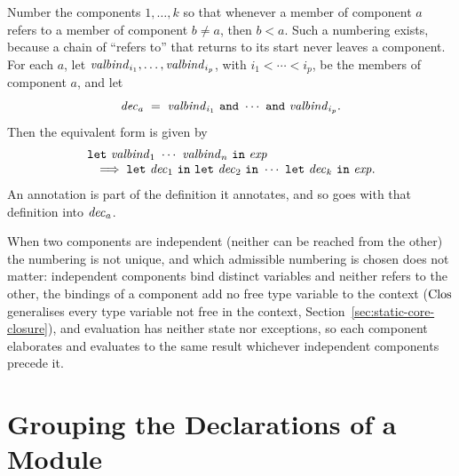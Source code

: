 Number the components $1,\ldots,k$ so that whenever a member of component $a$
refers to a member of component $b\neq a$, then $b<a$. Such a numbering
exists, because a chain of ``refers to'' that returns to its start never
leaves a component. For each $a$, let
$\mathit{valbind}_{i_1},\ldots,\mathit{valbind}_{i_p}$, with $i_1<\cdots<i_p$, be the members
of component $a$, and let
\[
  \dec_a \;=\; \valbind_{i_1}\ \kw{and}\ \cdots\ \kw{and}\ \valbind_{i_p}.
\]
Then the equivalent form is given by
\[
  \begin{array}{l}
    \textnormal{\texttt{let}}\ \mathit{valbind}_1\ \cdots\ \mathit{valbind}_n\ \textnormal{\texttt{in}}\ \mathit{exp}\\
    \quad\Longrightarrow\;
    \textnormal{\texttt{let}}\ \mathit{dec}_1\ \textnormal{\texttt{in}}\ \textnormal{\texttt{let}}\ \mathit{dec}_2\ \textnormal{\texttt{in}}\ \cdots\
    \textnormal{\texttt{let}}\ \mathit{dec}_k\ \textnormal{\texttt{in}}\ \mathit{exp} .
  \end{array}
\]
An annotation is part of the definition it annotates, and so goes with that
definition into $\mathit{dec}_a$.

When two components are independent (neither can be reached from the other)
the numbering is not unique, and which admissible numbering is chosen does not
matter: independent components bind distinct variables and neither refers to
the other, the bindings of a component add no free type variable to the
context ($\mathrm{Clos}$ generalises every type variable not free in the context,
Section~\ref{sec:static-core-closure}), and evaluation has neither state nor
exceptions, so each component elaborates and evaluates to the same result
whichever independent components precede it. %

\section{Grouping the Declarations of a Module}
\label{sec:appendix-derived-forms-modules}

